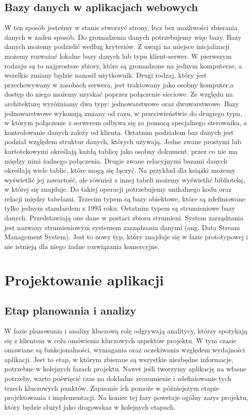 \subsection{Bazy danych w aplikacjach webowych}

W ten sposób jesteśmy w stanie stworzyć strony, lecz bez możliwości zbierania danych w żaden sposób. Do gromadzenia danych potrzebujemy więc bazy. Bazy danych możemy podzielić według kryteriów. Z uwagi na miejsce inicjalizacji możemy rozważać lokalne bazy danych lub typu klient-serwer. W pierwszym rodzaju są to najprostsze zbiory, które są gromadzone na jednym komputerze, a wszelkie zmiany będzie nanosił użytkownik. Drugi rodzaj, który jest przechowywany w zasobach serwera, jest traktowany jako osobny komputer,a dostęp do niego możemy uzyskać poprzez połączenie sieciowe. Ze względu na architekturę wyróżniamy dwa typy: jednowarstwowe oraz dwuwarstwowe. Bazy jednowarstwowe wykonują zmiany od razu, w przeciwieństwie do drugiego typu, w którym połączenie z serwerem odbywa się za pomocą specjalnego sterownika, a kontrolowanie danych zależy od klienta. Ostatnim podziałem baz danych jest podział względem struktur danych, których używają. Jedne zwane prostymi lub kartotekowymi określają każdą tablicę jako osobny dokument, przez co nie ma między nimi żadnego połączenia. Drugie zwane relacyjnymi bazami danych określają wiele tablic, które mogą się łączyć. Na przykład dla książki możemy wyświetlić jej zawartość, ale również z innej tabeli możemy wyświetlić bibliotekę, w której się znajduje. Do takiej operacji potrzebujemy unikalnego kodu oraz relacji między tabelami. Trzecim typem są bazy obiektowe, które są zdefiniowane tylko jednym standardem z 1993 roku. Ostatnim typem są strumieniowe bazy danych. Przedstawiają one dane w postaci zbioru strumieni. System zarządzania jest nazwany strumieniowym systemem zarządzania danymi (ang. Data Stream Management System). Jest to nowy typ, który znajduje się w fazie prototypowej i nie istnieją dla niego żadne rozwiązania komercyjne.

\section{Projektowanie aplikacji}
\subsection{Etap planowania i analizy}

W fazie planowania i analizy kluczową rolę odgrywają analitycy, którzy spotykają się z klientem w celu omówienia kluczowych aspektów projektu. W tym czasie omawiane są funkcjonalności, wymagania oraz oczekiwania względem wydajności aplikacji. Jest to etap, w którym zbierane są wszystkie niezbędne informacje, potrzebne w kolejnych fazach projektu. Nawet jeśli tworzymy aplikację na własne potrzeby, warto poświęcić czas na dokładne zrozumienie i zdefiniowanie tych trzech kluczowych punktów. Zapisanie ich pomoże w późniejszym etapie projektowania i implementacji. Na koniec tej fazy powstaje ogólny zarys projektu, który będzie służył jako drogowskaz w kolejnych etapach. \cite{Etapy}

